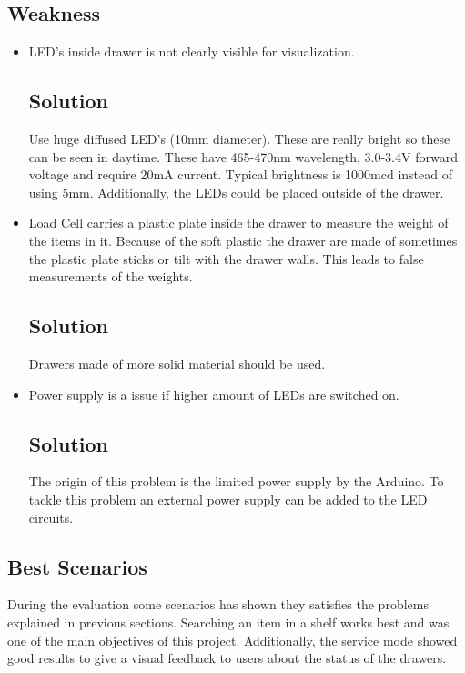 \subsection{Weakness}
\begin{itemize}
  \item LED's inside drawer is not clearly visible for visualization.
        \subsection{Solution}
         Use huge diffused LED's (10mm diameter). These are really bright so these can be seen in daytime. These have 465-470nm wavelength, 3.0-3.4V forward voltage and require 20mA current. Typical brightness is 1000mcd instead of using 5mm.
         Additionally, the LEDs could be placed outside of the drawer. 
         
  \item Load Cell carries a plastic plate inside the drawer to measure the weight of the items in it. 
  Because of the soft plastic the drawer are made of sometimes the plastic plate sticks or tilt with the drawer walls. 
  This leads to false measurements of the weights.
  		 \subsection{Solution}
  		 Drawers made of more solid material should be used. 
  \item  Power supply is a issue if higher amount of LEDs are switched on.
  	   \subsection{Solution}
		The origin of this problem is the limited power supply by the Arduino. 
		To tackle this problem an external power supply can be added to the LED circuits. 
\end{itemize}

\subsection{Best Scenarios} 
During the evaluation some scenarios has shown they satisfies the problems explained in previous sections. 
Searching an item in a shelf works best and was one of the main objectives of this project. 
Additionally, the service mode showed good results to give a visual feedback to users about the status of the drawers. 
  
